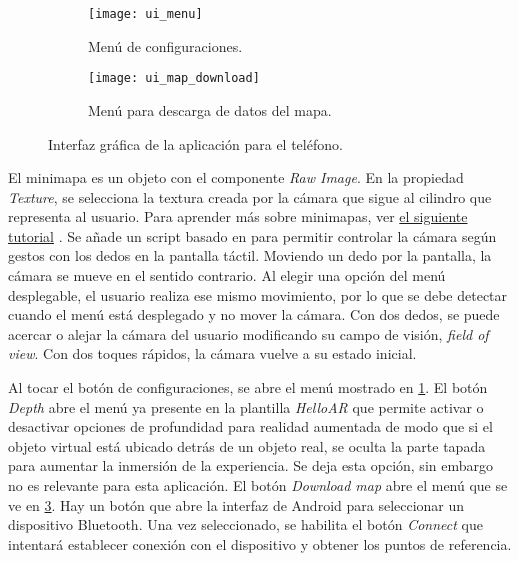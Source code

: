 \documentclass{article}
\newenvironment{standalone}{\begin{preview}}{\end{preview}}
\begin{document}
\begin{standalone}
\begin{figure}[ht!]
\begin{subfigure}[b]{0.70\textwidth}
   \texttt{[image: ui\_menu]}
   \caption{Menú de configuraciones.}
   \label{fig:ui_menu}
\end{subfigure}
\vspace{1em}

\begin{subfigure}[b]{0.70\textwidth}
   \texttt{[image: ui\_map\_download]}
   \caption{Menú para descarga de datos del mapa.}
   \label{fig:ui_map_download}
\end{subfigure}
\vspace{1em}

\caption{Interfaz gráfica de la aplicación para el teléfono.}
\end{figure}

El minimapa es un objeto con el componente \textit{Raw Image}.
En la propiedad \textit{Texture}, se selecciona la textura creada por la cámara que sigue al cilindro que representa al usuario.
Para aprender más sobre minimapas, ver \href{https://www.youtube.com/watch?v=28JTTXqMvOU}{el siguiente tutorial} \cite{miniMap}.
Se añade un script basado en \cite{indoorNavRacoons} para permitir controlar la cámara según gestos con los dedos en la pantalla táctil.
Moviendo un dedo por la pantalla, la cámara se mueve en el sentido contrario.
Al elegir una opción del menú desplegable, el usuario realiza ese mismo movimiento, por lo que se debe detectar cuando el menú está desplegado y no mover la cámara.
Con dos dedos, se puede acercar o alejar la cámara del usuario modificando su campo de visión, \textit{field of view}.
Con dos toques rápidos, la cámara vuelve a su estado inicial.

Al tocar el botón de configuraciones, se abre el menú mostrado en \cref{fig:ui_menu}.
El botón \textit{Depth} abre el menú ya presente en la plantilla \textit{HelloAR} que permite activar o desactivar opciones de profundidad para realidad aumentada de modo que si el objeto virtual está ubicado detrás de un objeto real, se oculta la parte tapada para aumentar la inmersión de la experiencia.
Se deja esta opción, sin embargo no es relevante para esta aplicación.
El botón \textit{Download map} abre el menú que se ve en \cref{fig:ui_map_download}.
Hay un botón que abre la interfaz de Android para seleccionar un dispositivo Bluetooth.
Una vez seleccionado, se habilita el botón \textit{Connect} que intentará establecer conexión con el dispositivo y obtener los puntos de referencia.

\end{standalone}
\end{document}
